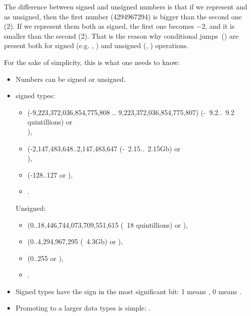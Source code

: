 The difference between signed and unsigned numbers is that if we represent  and  
as unsigned, then the first number (4294967294) is bigger than the second one (2). 
If we represent them both as signed, the first one becomes $-2$, and it is smaller than the second (2). 
That is the reason why conditional jumps~() are present both for signed (e.g. \JG, \JL) 
and unsigned (\JA, \JB) operations.

For the sake of simplicity, this is what one needs to know:

\begin{itemize}
\item Numbers can be signed or unsigned.

\item \CCpp signed types:

  \begin{itemize}
    \item {} (-9,223,372,036,854,775,808 .. 9,223,372,036,854,775,807)
	  (-~9.2..~9.2 quintillions) or \\
                ),
    \item \Tint (-2,147,483,648..2,147,483,647 (-~2.15..~2.15Gb) or \\
	    ),
    \item \Tchar (-128..127 or ),
    \item {}.
   \end{itemize}

	Unsigned:
  \begin{itemize}
	  \item {} (0..18,446,744,073,709,551,615 
		  (~18 quintillions) or ),
   \item {} (0..4,294,967,295 (~4.3Gb) or ),
   \item {} (0..255 or ), 
   \item {}.
  \end{itemize}

\item Signed types have the sign in the most significant bit: 1 means , 0 means .

\item Promoting to a larger data types is simple:
.


\end{itemize}
